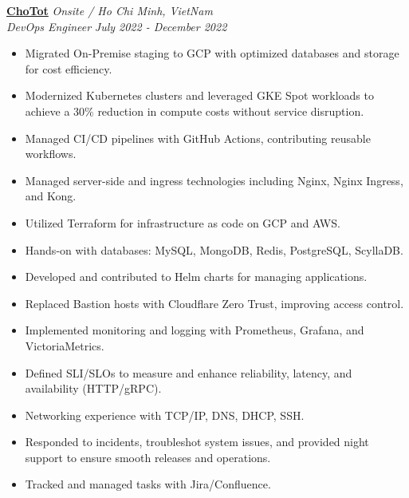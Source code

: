 \documentclass[11pt, a4paper]{article}
\begin{document}
\vspace{0.5em}
\textbf{\href{https://www.chotot.com/}{ChoTot}} \hfill {\small\textit{Onsite / Ho Chi Minh, VietNam}} \\
\textit{DevOps Engineer} \hfill {\small\textit{July 2022 - December 2022}}
\begin{itemize}[leftmargin=*]
    \item Migrated On-Premise staging to GCP with optimized databases and storage for cost efficiency.
    \item Modernized Kubernetes clusters and leveraged GKE Spot workloads to achieve a 30\% reduction in compute costs without service disruption.
    \item Managed CI/CD pipelines with GitHub Actions, contributing reusable workflows.
    \item Managed server-side and ingress technologies including Nginx, Nginx Ingress, and Kong.
    \item Utilized Terraform for infrastructure as code on GCP and AWS.
    \item Hands-on with databases: MySQL, MongoDB, Redis, PostgreSQL, ScyllaDB.
    \item Developed and contributed to Helm charts for managing applications.
    \item Replaced Bastion hosts with Cloudflare Zero Trust, improving access control.
    \item Implemented monitoring and logging with Prometheus, Grafana, and VictoriaMetrics.
    \item Defined SLI/SLOs to measure and enhance reli\-abil\-ity, la\-ten\-cy, and avail\-abil\-ity (HTTP/\-gRPC).
    \item Networking experience with TCP/IP, DNS, DHCP, SSH.
    \item Responded to incidents, troubleshot system issues, and provided night support to ensure smooth releases and operations.
    \item Tracked and managed tasks with Jira/Confluence.
\end{itemize}
\end{document}
